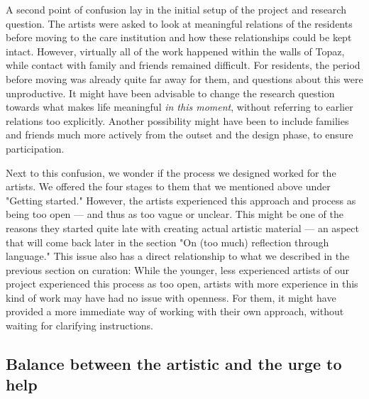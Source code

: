 \documentclass[authordate, empirical]{jote-new-article}
\begin{document}
	A second point of confusion lay in the initial setup of the project and research question. The artists were asked to look at meaningful relations of the residents before moving to the care institution and how these relationships could be kept intact. However, virtually all of the work happened within the walls of Topaz, while contact with family and friends remained difficult. For residents, the period before moving was already quite far away for them, and questions about this were unproductive. It might have been advisable to change the research question towards what makes life meaningful \emph{in this moment}, without referring to earlier relations too explicitly. Another possibility might have been to include families and friends much more actively from the outset and the design phase, to ensure participation.







	Next to this confusion, we wonder if the process we designed worked for the artists. We offered the four stages to them that we mentioned above under "Getting started." However, the artists experienced this approach and process as being too open --- and thus as too vague or unclear. This might be one of the reasons they started quite late with creating actual artistic material --- an aspect that will come back later in the section "On (too much) reflection through language." This issue also has a direct relationship to what we described in the previous section on curation: While the younger, less experienced artists of our project experienced this process as too open, artists with more experience in this kind of work may have had no issue with openness. For them, it might have provided a more immediate way of working with their own approach, without waiting for clarifying instructions.







	\subsection{Balance between the artistic and the urge to help}
\end{document}
